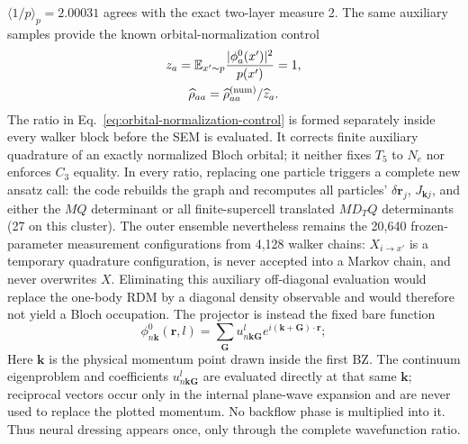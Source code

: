 $\langle1/p\rangle_p=2.00031$ agrees with the exact two-layer measure 2.
The same auxiliary samples provide the known orbital-normalization control
\begin{equation}
\begin{gathered}
 z_a=\mathbb E_{x'\sim p}\frac{|\phi_a^0(x')|^2}{p(x')}=1,
 \\
 \widehat\rho_{aa}=\widehat\rho^{\rm(num)}_{aa}/\widehat z_a .
\end{gathered}
\label{eq:orbital-normalization-control}
\end{equation}
The ratio in Eq.~\eqref{eq:orbital-normalization-control} is formed separately
inside every walker block before the SEM is evaluated. It corrects finite
auxiliary quadrature of an exactly normalized Bloch orbital; it neither fixes
$T_5$ to $N_e$ nor enforces $C_3$ equality. In
every ratio, replacing one particle triggers a complete new ansatz call: the
code rebuilds the graph and recomputes all particles' $\delta\bm r_j$,
$J_{\bm k j}$, and either the $M Q$ determinant or all finite-supercell translated
$M D_TQ$ determinants (27 on this cluster). The
outer ensemble nevertheless remains the 20,640 frozen-parameter measurement
configurations from 4,128 walker chains:
$X_{i\to x'}$ is a temporary quadrature configuration, is never accepted into
a Markov chain, and never overwrites $X$. Eliminating this auxiliary
off-diagonal evaluation would replace the one-body RDM by a diagonal density
observable and would therefore not yield a Bloch occupation. The
projector is instead the fixed bare function
\begin{equation}
 \phi^0_{n\bm k}(\bm r,l)=\sum_{\bm G}u^l_{n\bm k\bm G}
 e^{i(\bm k+\bm G)\cdot\bm r};
\end{equation}
Here $\bm k$ is the physical momentum point drawn inside the first BZ.  The
continuum eigenproblem and coefficients $u^l_{n\bm k\bm G}$ are evaluated
directly at that same $\bm k$; reciprocal vectors occur only in the internal
plane-wave expansion and are never used to replace the plotted momentum.
No backflow phase is multiplied into it.  Thus neural dressing appears once,
only through the complete wavefunction ratio.

